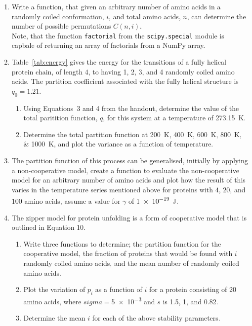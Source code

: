 \documentclass[a4paper]{article}
\begin{document}
\begin{enumerate}
    \item Write a function, that given an arbitrary number of amino acids in a randomly coiled conformation, $i$, and total amino acids, $n$, can determine the number of possible permutations $C(n, i)$. \\ Note, that the function \texttt{factorial} from the \texttt{scipy.special} module is capbale of returning an array of factorials from a NumPy array. 
    \item Table~\ref{tab:energy} gives the energy for the transitions of a fully helical protein chain, of length 4, to having 1, 2, 3, and 4 randomly coiled amino acids. The partition coefficient associated with the fully helical structure is $q_0 = 1.21$. 
    \begin{enumerate}
        \item Using Equations~3 and 4 from the handout, determine the value of the total paritition function, $q$, for this system at a temperature of \SI{273.15}{\kelvin}.
        \item Determine the total partition function at \SIlist{200;400;600;800;1000}{\kelvin}, and plot the variance as a function of temperature.  
    \end{enumerate}
    \item The partition function of this process can be generalised, initially by applying a non-cooperative model, create a function to evaluate the non-cooperative model for an arbitrary number of amino acids and plot how the result of this varies in the temperature series mentioned above for proteins with $4$, $20$, and $100$ amino acids, assume a value for $\gamma$ of \SI{1e-19}{\joule}.
    \item The zipper model for protein unfolding is a form of cooperative model that is outlined in Equation 10.
    \begin{enumerate}
        \item Write three functions to determine; the partition function for the cooperative model, the fraction of proteins that would be found with $i$ randomly coiled amino acids, and the mean number of randomly coiled amino acids.
        \item Plot the variation of $p_i$ as a function of $i$ for a protein consisting of 20 amino acids, where $sigma = $\num{5e-3} and $s$ is 1.5, 1, and 0.82. 
        \item Determine the mean $i$ for each of the above stability parameters. 
    \end{enumerate}
\end{enumerate}
\end{document}
